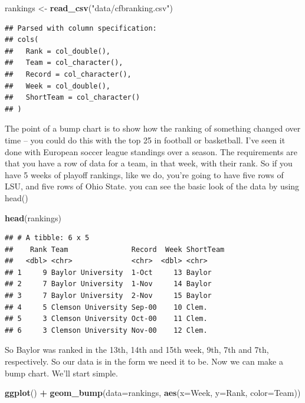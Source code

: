 \documentclass[]{book}
\newenvironment{Shaded}{\begin{snugshade}}{\end{snugshade}}
\newcommand{\DataTypeTok}[1]{\textcolor[rgb]{0.13,0.29,0.53}{#1}}
\newcommand{\KeywordTok}[1]{\textcolor[rgb]{0.13,0.29,0.53}{\textbf{#1}}}
\newcommand{\NormalTok}[1]{#1}
\newcommand{\OperatorTok}[1]{\textcolor[rgb]{0.81,0.36,0.00}{\textbf{#1}}}
\newcommand{\StringTok}[1]{\textcolor[rgb]{0.31,0.60,0.02}{#1}}
\begin{document}
\begin{Shaded}
\begin{Highlighting}[]
\NormalTok{rankings <-}\StringTok{ }\KeywordTok{read_csv}\NormalTok{(}\StringTok{"data/cfbranking.csv"}\NormalTok{)}
\end{Highlighting}
\end{Shaded}

\begin{verbatim}
## Parsed with column specification:
## cols(
##   Rank = col_double(),
##   Team = col_character(),
##   Record = col_character(),
##   Week = col_double(),
##   ShortTeam = col_character()
## )
\end{verbatim}

The point of a bump chart is to show how the ranking of something changed over time -- you could do this with the top 25 in football or basketball. I've seen it done with European soccer league standings over a season. The requirements are that you have a row of data for a team, in that week, with their rank. So if you have 5 weeks of playoff rankings, like we do, you're going to have five rows of LSU, and five rows of Ohio State. you can see the basic look of the data by using head()

\begin{Shaded}
\begin{Highlighting}[]
\KeywordTok{head}\NormalTok{(rankings)}
\end{Highlighting}
\end{Shaded}

\begin{verbatim}
## # A tibble: 6 x 5
##    Rank Team               Record  Week ShortTeam
##   <dbl> <chr>              <chr>  <dbl> <chr>    
## 1     9 Baylor University  1-Oct     13 Baylor   
## 2     7 Baylor University  1-Nov     14 Baylor   
## 3     7 Baylor University  2-Nov     15 Baylor   
## 4     5 Clemson University Sep-00    10 Clem.    
## 5     3 Clemson University Oct-00    11 Clem.    
## 6     3 Clemson University Nov-00    12 Clem.
\end{verbatim}

So Baylor was ranked in the 13th, 14th and 15th week, 9th, 7th and 7th, respectively. So our data is in the form we need it to be. Now we can make a bump chart. We'll start simple.

\begin{Shaded}
\begin{Highlighting}[]
\KeywordTok{ggplot}\NormalTok{() }\OperatorTok{+}\StringTok{ }\KeywordTok{geom_bump}\NormalTok{(}\DataTypeTok{data=}\NormalTok{rankings, }\KeywordTok{aes}\NormalTok{(}\DataTypeTok{x=}\NormalTok{Week, }\DataTypeTok{y=}\NormalTok{Rank, }\DataTypeTok{color=}\NormalTok{Team))}
\end{Highlighting}
\end{Shaded}
\end{document}
